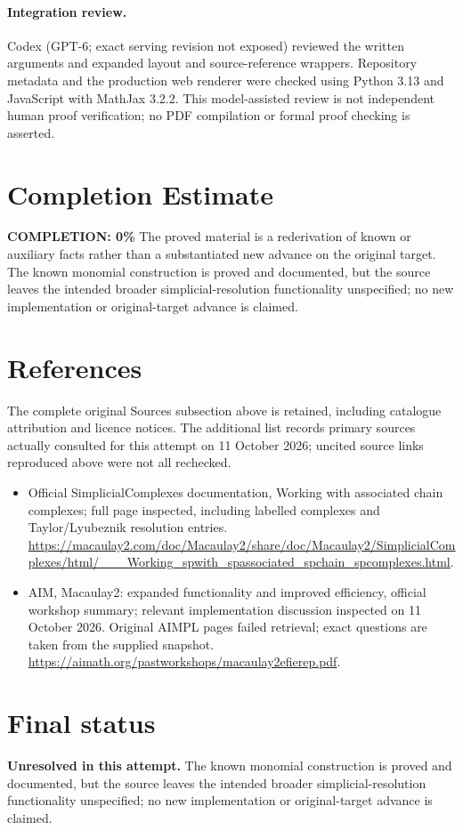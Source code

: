 \documentclass[11pt]{article}
\begin{document}
\paragraph{Integration review.} Codex (GPT-6; exact serving revision not exposed) reviewed the written arguments and expanded layout and source-reference wrappers. Repository metadata and the production web renderer were checked using Python 3.13 and JavaScript with MathJax 3.2.2. This model-assisted review is not independent human proof verification; no PDF compilation or formal proof checking is asserted.

\section{Completion Estimate}
\noindent\textbf{COMPLETION: 0\%}
The proved material is a rederivation of known or auxiliary facts rather than a substantiated new advance on the original target. The known monomial construction is proved and documented, but the source leaves the intended broader simplicial-resolution functionality unspecified; no new implementation or original-target advance is claimed.
\section{References}
The complete original Sources subsection above is retained, including catalogue attribution and licence notices. The additional list records primary sources actually consulted for this attempt on 11 October 2026; uncited source links reproduced above were not all rechecked.
\begin{itemize}
\item Official SimplicialComplexes documentation, Working with associated chain complexes; full page inspected, including labelled complexes and Taylor/Lyubeznik resolution entries. \url{https://macaulay2.com/doc/Macaulay2/share/doc/Macaulay2/SimplicialComplexes/html/___Working_spwith_spassociated_spchain_spcomplexes.html}.
\item AIM, Macaulay2: expanded functionality and improved efficiency, official workshop summary; relevant implementation discussion inspected on 11 October 2026. Original AIMPL pages failed retrieval; exact questions are taken from the supplied snapshot. \url{https://aimath.org/pastworkshops/macaulay2efierep.pdf}.
\end{itemize}
\section{Final status}
\textbf{Unresolved in this attempt.} The known monomial construction is proved and documented, but the source leaves the intended broader simplicial-resolution functionality unspecified; no new implementation or original-target advance is claimed.
\end{document}
